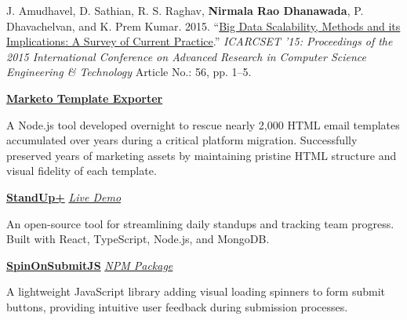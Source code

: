 \documentclass[11pt,article,oneside]{memoir}
\begin{document}
\bigskip
\vspace{0.5em}
\ind J. Amudhavel, D. Sathian, R. S. Raghav, \textbf{Nirmala Rao Dhanawada}, P. Dhavachelvan, and K. Prem Kumar. 2015. ``\href{https://dl.acm.org/doi/10.1145/2743065.2743121}{Big Data Scalability, Methods and its Implications: A Survey of Current Practice}.'' \emph{ICARCSET '15: Proceedings of the 2015 International Conference on Advanced Research in Computer Science Engineering \& Technology} Article No.: 56, pp. 1--5.

\bigskip
\vspace{0.5em}

\ind \textbf{\href{https://github.com/thedhanawada/marketo-template-exporter}{Marketo Template Exporter}}

\ind A Node.js tool developed overnight to rescue nearly 2,000 HTML email templates accumulated over years during a critical platform migration. Successfully preserved years of marketing assets by maintaining pristine HTML structure and visual fidelity of each template.

\bigskip

\ind \textbf{\href{https://github.com/thedhanawada/standupplus}{StandUp+}} \hfill \emph{\href{https://standupplus.dhanawada.org/}{Live Demo}}

\ind An open-source tool for streamlining daily standups and tracking team progress. Built with React, TypeScript, Node.js, and MongoDB.

\bigskip

\ind \textbf{\href{https://github.com/thedhanawada/SpinOnSubmitJS}{SpinOnSubmitJS}} \hfill \emph{\href{https://www.npmjs.com/package/spinonsubmitjs}{NPM Package}}

\ind A lightweight JavaScript library adding visual loading spinners to form submit buttons, providing intuitive user feedback during submission processes.

\bigskip
\end{document}
